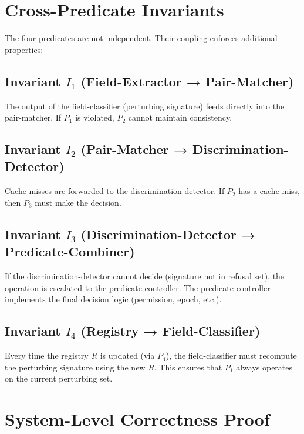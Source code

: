 \documentclass[11pt,oneside]{article}
\begin{document}
\section{Cross-Predicate Invariants}

The four predicates are not independent. Their coupling enforces additional properties:

\subsection{Invariant $I_1$ (Field-Extractor → Pair-Matcher)}

The output of the field-classifier (perturbing signature) feeds directly into the pair-matcher. If $P_1$ is violated, $P_2$ cannot maintain consistency.

\subsection{Invariant $I_2$ (Pair-Matcher → Discrimination-Detector)}

Cache misses are forwarded to the discrimination-detector. If $P_2$ has a cache miss, then $P_3$ must make the decision.

\subsection{Invariant $I_3$ (Discrimination-Detector → Predicate-Combiner)}

If the discrimination-detector cannot decide (signature not in refusal set), the operation is escalated to the predicate controller. The predicate controller implements the final decision logic (permission, epoch, etc.).

\subsection{Invariant $I_4$ (Registry → Field-Classifier)}

Every time the registry $R$ is updated (via $P_4$), the field-classifier must recompute the perturbing signature using the new $R$. This ensures that $P_1$ always operates on the current perturbing set.

\section{System-Level Correctness Proof}
\end{document}
